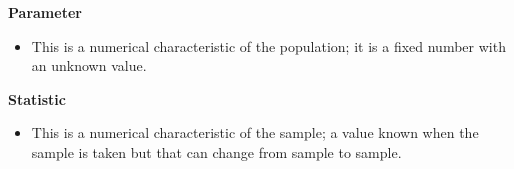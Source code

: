 \documentclass[a4paper,12pt]{article}
\begin{document}
\begin{framed}
\noindent \textbf{Parameter}
\begin{itemize}
	\item This is a numerical characteristic of the population; it is
	a fixed number with an unknown value.\\ \vspace{0.2cm}
\end{itemize}
\vspace{-0.8cm}
\noindent \textbf{Statistic}
\begin{itemize}
	\item This is a numerical characteristic of the sample; a value
	known when the sample is taken but that can change from sample to
	sample.
\end{itemize}
\end{framed}



%
%
%
%
%
\end{document}
